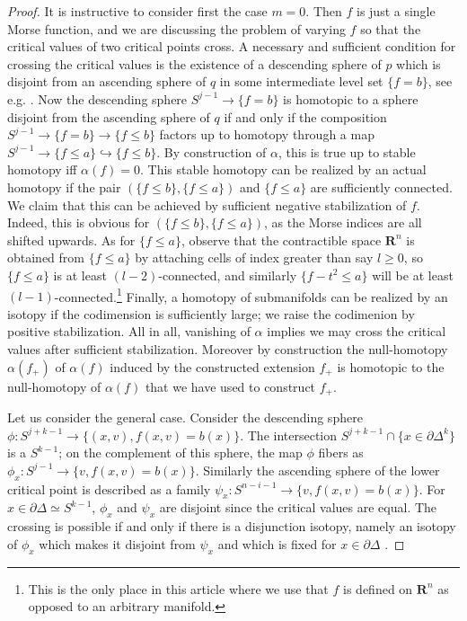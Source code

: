 \documentclass[12pt,a4paper]{article}
\numberwithin{equation}{section}
\theoremstyle{definition}
\theoremstyle{remark}
\newcommand{\R}{\mathbf{R}}
\newcommand{\del}{\partial}
\begin{document}
\begin{proof}
    It is instructive to consider first the case $m=0$.  Then $f$ is just a single Morse function, and we are discussing the problem of varying $f$ so that the critical values of two critical points cross.
    A necessary and sufficient condition for crossing the critical values is the existence
    of a descending sphere of $p$ which is disjoint from an ascending sphere of $q$ in some intermediate level set $\{f=b\}$, see e.g. \cite{Cerf-stratification, Hatcher-Wagoner}.
    Now the descending sphere $S^{j-1}\to \{f=b\}$ is homotopic to a sphere disjoint from the ascending sphere of $q$ if and only if the composition $S^{j-1}\to \{f=b\}\to \{f\leq b\}$ factors up to homotopy  through a map $S^{j-1}\to \{f \leq a\} \hookrightarrow \{f \leq b\}$.  By construction of $\alpha$,  this is true up to stable homotopy iff $\alpha(f) = 0$.  This stable homotopy can be realized by an actual homotopy if the pair $(\{f\leq b\},\{f\leq a\})$ and $\{f\leq a\}$ are sufficiently connected.   We claim that this can be achieved by sufficient negative stabilization of $f$.  Indeed, this is obvious for $(\{f\leq b\},\{f\leq a\})$, as the Morse indices are all shifted upwards.  As for  $\{f\leq a\}$, observe that the contractible space $\R^n$ is obtained from $\{f\leq a\}$ by attaching cells of index greater than say $l\geq 0$, so $\{f \leq a\}$ is  at least $(l-2)$-connected, and similarly $\{ f - t^2\leq a\}$ will be at least $(l-1)$-connected.\footnote{This is the only place in this article where we use that $f$ is defined on $\R^n$ as opposed to an arbitrary manifold.}
    Finally, a homotopy of submanifolds can be realized by an isotopy if the codimension is sufficiently large; we raise the codimenion by positive stabilization.
    All in all, vanishing of $\alpha$ implies we may cross the critical values after sufficient stabilization. Moreover by construction
the null-homotopy $\alpha(f_+)$ of $\alpha(f)$ induced by the constructed extension $f_+$ is homotopic to
the null-homotopy of $\alpha(f)$ that we have used to construct $f_+$.

    Let us consider the general case. Consider the descending sphere $\phi:S^{j+k-1}\to \{(x,v),f(x,v)=b(x)\}$.
    The intersection $S^{j+k-1} \cap \{x \in \partial \Delta^k\}$ is a $S^{k-1}$; on the complement of this sphere, the map $\phi$ fibers as
    $\phi_x:S^{j-1}\to \{v,f(x,v)=b(x)\}$.
    Similarly the ascending sphere of the lower critical point is described as a family $\psi_x:S^{n-i-1}\to \{v, f(x,v)=b(x)\}$. For $x\in \del \Delta\simeq S^{k-1}$, $\phi_x$ and $\psi_x$ are disjoint since the critical values are equal.
    The crossing is possible if and only if there is a disjunction isotopy, namely an isotopy of $\phi_x$ which makes it disjoint from $\psi_x$ and which is fixed for $x\in \del \Delta$ \cite[Theorem 4.11]{igusa88}.


\end{proof}
\end{document}
